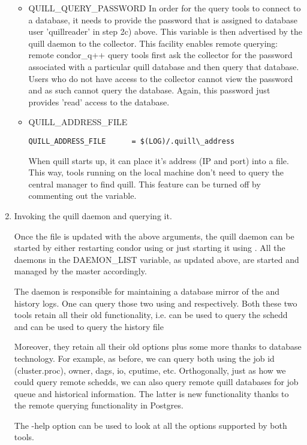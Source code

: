\begin{enumerate}
\begin{itemize}
\item QUILL\_QUERY\_PASSWORD
In order for the query tools to connect to a database, it needs to
provide the password that is assigned to database user 'quillreader' in
step 2c) above. This variable is then advertised by the quill daemon to
the collector.  This facility enables remote querying: remote condor\_q++
query tools first ask the collector for the password associated with a
particular quill database and then query that database.  Users who do
not have access to the collector cannot view the password and as such
cannot query the database.  Again, this password just provides 'read'
access to the database.

\item QUILL\_ADDRESS\_FILE

\begin{verbatim}
QUILL_ADDRESS_FILE      = $(LOG)/.quill\_address
\end{verbatim}

When quill starts up, it can place it's address (IP and port)
into a file.  This way, tools running on the local machine don't
need to query the central manager to find quill.  This 
feature can be turned off by commenting out the variable.

\end{itemize}

\item Invoking the quill daemon and querying it.

Once the  file is updated with the above arguments,
the quill daemon can be started by either restarting condor using
 or just starting it using .  All the daemons
in the DAEMON\_LIST variable, as updated above, are started and managed
by the master accordingly.

The  daemon is responsible for maintaining a database
mirror of the  and history logs.  One can query those two
using  and  respectively.  Both these two
tools retain all their old functionality, i.e.  can be used
to query the schedd and  can be used to query the
history file

Moreover, they retain all their old options plus some more thanks to
database technology.  For example, as before, we can query both using
the job id (cluster.proc), owner, dags, io, cputime, etc.  Orthogonally,
just as how we could query remote schedds, we can also query remote quill
databases for job queue and historical information.  The latter is new
functionality thanks to the remote querying functionality in Postgres.

The -help option can be used to look at all the options supported by
both tools.
\end{enumerate}


